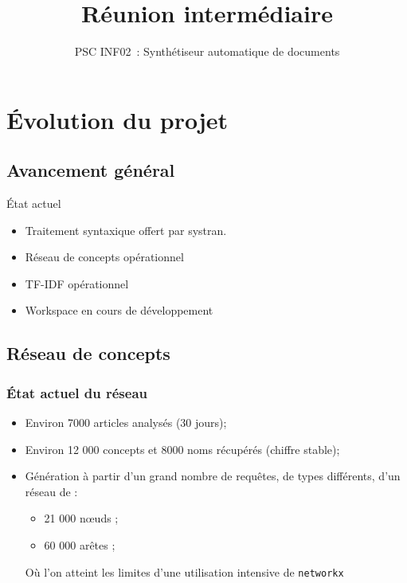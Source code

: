 \documentclass{beamer}
\title{Réunion intermédiaire}
\subtitle{PSC INF02~: Synthétiseur automatique de documents}
\author{}
\institute{École polytechnique}
\date{}
\begin{document}
\beamertemplatenavigationsymbolsempty{}
\beamerdefaultoverlayspecification{<+->}
\begin{frame}
  \titlepage{}
\end{frame}

\section{Évolution du projet}
\subsection{Avancement général}

\begin{frame}
  \begin{block}{État actuel}
    \begin{itemize}
      \item Traitement syntaxique offert par systran.
      \item Réseau de concepts opérationnel
      \item TF-IDF opérationnel
      \item Workspace en cours de développement
    \end{itemize}
  \end{block}
\end{frame}

\subsection{Réseau de concepts}
\begin{frame}
\frametitle{État actuel du réseau}

\begin{itemize}
 \item Environ 7000 articles analysés (30 jours);
 \item Environ 12 000 concepts et 8000 noms récupérés (chiffre stable);
 \item Génération à partir d'un grand nombre de requêtes, de types différents, d'un réseau de :
 \begin{itemize}
  \item 21 000 n\oe uds ;
  \item 60 000 arêtes ;
 \end{itemize}
 \pause
 Où l'on atteint les limites d'une utilisation intensive de \texttt{networkx}
 
\end{itemize}

\end{frame}
\end{document}
